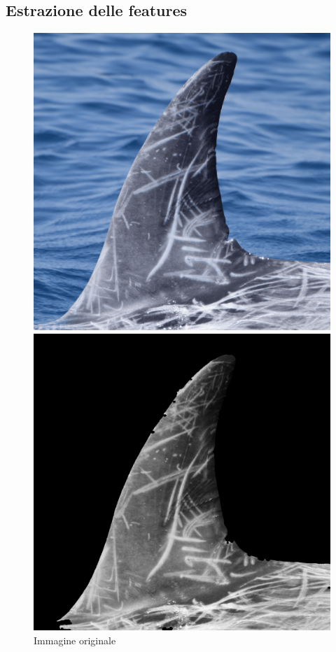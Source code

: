 \documentclass[a4paper,12pt]{report}
\begin{document}
    \subsection{Estrazione delle features}
    \begin{figure}[H]
      
      \centering
      \begin{minipage}{0.3\textwidth}
        \centering
        \includegraphics[width=\textwidth]{assets/images/methods/porting/features_extraction/original.png}   
        \caption{Immagine originale}
      \end{minipage}
      \begin{minipage}{0.3\textwidth}
        \centering
        \includegraphics[width=\textwidth]{assets/images/methods/porting/features_extraction/gray.png}  

\end{minipage}
\end{figure}
\end{document}
